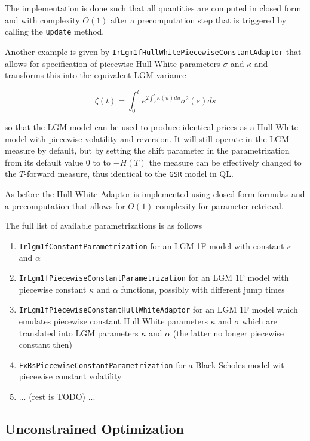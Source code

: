 \documentclass[12pt, a4paper]{article}
\begin{document}
The implementation is done such that all quantities are computed in closed form and with complexity $O(1)$ after a precomputation step that is triggered by calling the \verb+update+ method.

Another example is given by \verb+IrLgm1fHullWhitePiecewiseConstantAdaptor+ that allows for specification of piecewise Hull White parameters $\sigma$ and $\kappa$ and transforms this into the equivalent LGM variance

\begin{equation}
\zeta(t) = \int_0^t e^{2\int_0^s \kappa(u) du} \sigma^2(s) ds
\end{equation}

so that the LGM model can be used to produce identical prices as a Hull White model with piecewise volatility and reversion. It will still operate in the LGM measure by default, but by setting the shift parameter in the parametrization from its default value $0$ to to $-H(T)$ the measure can be effectively changed to the $T$-forward measure, thus identical to the \verb+GSR+ model in QL.

As before the Hull White Adaptor is implemented using closed form formulas and a precomputation that allows for $O(1)$ complexity for parameter retrieval.

The full list of available parametrizations is as follows

\begin{enumerate}
\item \verb+Irlgm1fConstantParametrization+ for an LGM 1F model with constant $\kappa$ and $\alpha$
\item \verb+IrLgm1fPiecewiseConstantParametrization+ for an LGM 1F model with piecewise constant $\kappa$ and $\alpha$ functions, possibly with different jump times
\item \verb+IrLgm1fPiecewiseConstantHullWhiteAdaptor+ for an LGM 1F model which emulates piecewise constant Hull White parameters $\kappa$ and $\sigma$ which are translated into LGM parameters $\kappa$ and $\alpha$ (the latter no longer piecewise constant then)
\item \verb+FxBsPiecewiseConstantParametrization+ for a Black Scholes model wit piecewise constant volatility
\item ... (rest is TODO) ...
\end{enumerate}

\subsection{Unconstrained Optimization}
\end{document}
